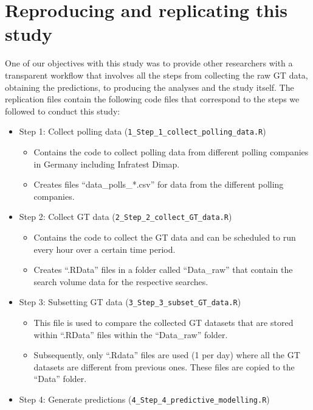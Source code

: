 \documentclass[
  letterpaper,
  DIV=11,
  numbers=noendperiod]{scrartcl}
\providecommand{\tightlist}{%
  \setlength{\itemsep}{0pt}\setlength{\parskip}{0pt}}\usepackage{longtable,booktabs,array}
\begin{document}
\hypertarget{reproducing-and-replicating-this-study}{%
\section{Reproducing and replicating this
study}\label{reproducing-and-replicating-this-study}}

One of our objectives with this study was to provide other researchers
with a transparent workflow that involves all the steps from collecting
the raw GT data, obtaining the predictions, to producing the analyses
and the study itself. The replication files contain the following code
files that correspond to the steps we followed to conduct this study:

\begin{itemize}
\tightlist
\item
  Step 1: Collect polling data
  (\texttt{1\_Step\_1\_collect\_polling\_data.R})

  \begin{itemize}
  \tightlist
  \item
    Contains the code to collect polling data from different polling
    companies in Germany including Infratest Dimap.
  \item
    Creates files ``data\_polls\_*.csv'' for data from the different
    polling companies.
  \end{itemize}
\item
  Step 2: Collect GT data (\texttt{2\_Step\_2\_collect\_GT\_data.R})

  \begin{itemize}
  \tightlist
  \item
    Contains the code to collect the GT data and can be scheduled to run
    every hour over a certain time period.
  \item
    Creates ``.RData'' files in a folder called ``Data\_raw'' that
    contain the search volume data for the respective searches.
  \end{itemize}
\item
  Step 3: Subsetting GT data (\texttt{3\_Step\_3\_subset\_GT\_data.R})

  \begin{itemize}
  \tightlist
  \item
    This file is used to compare the collected GT datasets that are
    stored within ``.RData'' files within the ``Data\_raw'' folder.
  \item
    Subsequently, only ``.Rdata'' files are used (1 per day) where all
    the GT datasets are different from previous ones. These files are
    copied to the ``Data'' folder.
  \end{itemize}
\item
  Step 4: Generate predictions
  (\texttt{4\_Step\_4\_predictive\_modelling.R})


\end{itemize}
\end{document}
